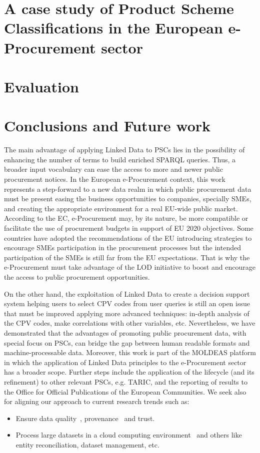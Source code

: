 \documentclass[preprint,12pt]{elsarticle}
\begin{document}
\section{A case study of Product Scheme Classifications in the European e-Procurement sector}\label{sect:use-case}

\section{Evaluation}\label{sect:evaluation}

\section{Conclusions and Future work}\label{sect:conclusions}
The main advantage of applying Linked Data to PSCs lies in the possibility of enhancing the number of terms to 
build enriched SPARQL queries. Thus, a broader input vocabulary can ease the access to more and newer public procurement notices. 
In the European e-Procurement context, this work represents a step-forward to a new data realm in which 
public procurement data must be present easing the business opportunities to companies, specially SMEs, 
and creating the appropriate environment for a real EU-wide public market. According to the EC, e-Procurement may, 
by its nature, be more compatible or facilitate the use of procurement budgets in support of EU 2020 objectives. 
Some countries have adopted the recommendations of the EU introducing strategies to encourage SMEs 
participation in the procurement processes but the intended participation of the SMEs is still far from the EU expectations. 
That is why the e-Procurement must take advantage of the LOD initiative to boost and encourage the access to public procurement opportunities.

On the other hand, the exploitation of Linked Data to create a decision support system helping users to select CPV codes 
from user queries is still an open issue that must be improved applying more advanced techniques: in-depth analysis of the CPV codes, 
make correlations with other variables, etc. Nevertheless, we have demonstrated that the advantages of promoting public procurement 
data, with special focus on PSCs, can bridge the gap between human readable formats and machine-processable data. Moreover, 
this work is part of the MOLDEAS platform in which the application of Linked Data principles to the e-Procurement sector has a broader scope. 
Further steps include the application of the lifecycle (and its refinement) to other relevant PSCs, e.g. TARIC, and the reporting 
of results to the Office for Official Publications of the European Communities. We seek also for aligning our approach to current 
research trends such as:
\begin{itemize}
 \item Ensure data quality~\cite{lodq}, provenance~\cite{DBLP:conf/ipaw/HartigZ10} and trust.
 \item Process large datasets in a cloud computing environment~\cite{DBLP:conf/closer/HausenblasGHC12}
 and others like entity reconciliation, dataset management, etc.
\end{itemize}
\end{document}
